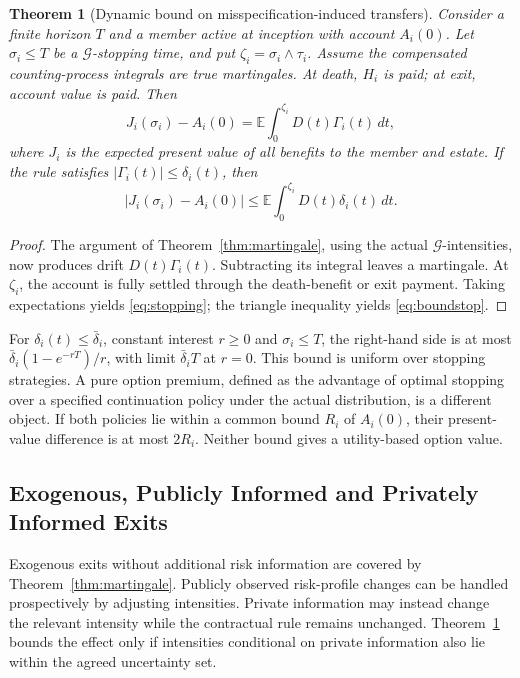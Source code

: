 \documentclass[11pt,a4paper]{article}
\newtheorem{theorem}{Theorem}[section]
\theoremstyle{definition}\newtheorem{definition}[theorem]{Definition}
\theoremstyle{remark}\newtheorem{remark}[theorem]{Remark}
\newcommand{\E}{\mathbb E}
\newcommand{\calG}{\mathcal G}
\begin{document}
\begin{theorem}[Dynamic bound on misspecification-induced transfers]\label{thm:stop}
Consider a finite horizon $T$ and a member active at inception with account $A_i(0)$. Let $\sigma_i\le T$ be a $\calG$-stopping time, and put $\zeta_i=\sigma_i\wedge\tau_i$. Assume the compensated counting-process integrals are true martingales. At death, $H_i$ is paid; at exit, account value is paid. Then
\begin{equation}\label{eq:stopping}
J_i(\sigma_i)-A_i(0)
=\E\int_0^{\zeta_i}D(t)\Gamma_i(t)\,dt,
\end{equation}
where $J_i$ is the expected present value of all benefits to the member and estate. If the rule satisfies $|\Gamma_i(t)|\le\delta_i(t)$, then
\begin{equation}\label{eq:boundstop}
|J_i(\sigma_i)-A_i(0)|
\le\E\int_0^{\zeta_i}D(t)\delta_i(t)\,dt.
\end{equation}
\end{theorem}
\begin{proof}
The argument of Theorem~\ref{thm:martingale}, using the actual $\calG$-intensities, now produces drift $D(t)\Gamma_i(t)$. Subtracting its integral leaves a martingale. At $\zeta_i$, the account is fully settled through the death-benefit or exit payment. Taking expectations yields \eqref{eq:stopping}; the triangle inequality yields \eqref{eq:boundstop}.
\end{proof}
For $\delta_i(t)\le\bar\delta_i$, constant interest $r\ge0$ and $\sigma_i\le T$, the right-hand side is at most $\bar\delta_i(1-e^{-rT})/r$, with limit $\bar\delta_iT$ at $r=0$. This bound is uniform over stopping strategies. A pure option premium, defined as the advantage of optimal stopping over a specified continuation policy under the actual distribution, is a different object. If both policies lie within a common bound $R_i$ of $A_i(0)$, their present-value difference is at most $2R_i$. Neither bound gives a utility-based option value.

\subsection{Exogenous, Publicly Informed and Privately Informed Exits}
Exogenous exits without additional risk information are covered by Theorem~\ref{thm:martingale}. Publicly observed risk-profile changes can be handled prospectively by adjusting intensities. Private information may instead change the relevant intensity while the contractual rule remains unchanged. Theorem~\ref{thm:stop} bounds the effect only if intensities conditional on private information also lie within the agreed uncertainty set.
\end{document}
